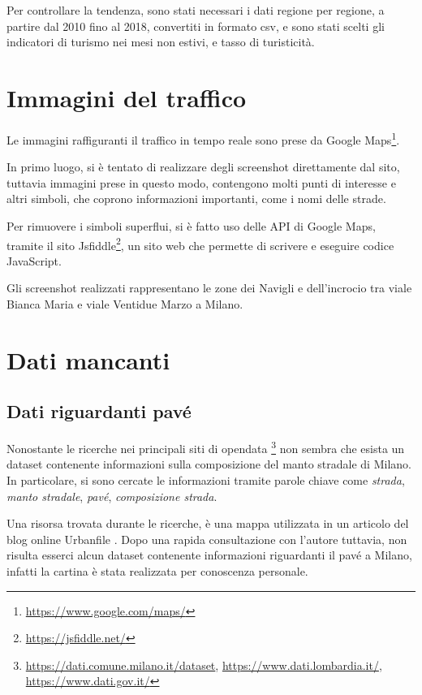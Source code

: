 \documentclass[a4paper,12pt]{report}
\newcommand{\quotestyle}[1]{\textit{#1}}
\begin{document}
Per controllare la tendenza, sono stati necessari i dati regione per regione, 
a partire dal 2010 fino al 2018, convertiti in formato csv, e sono stati scelti gli 
indicatori di turismo nei mesi non estivi, e tasso di turisticità. 

\section{Immagini del traffico}

Le immagini raffiguranti il traffico in tempo reale sono prese da Google 
Maps\footnote{\url{https://www.google.com/maps/}}. 

In primo luogo, si è tentato di realizzare degli screenshot direttamente dal sito, 
tuttavia immagini prese in questo modo, contengono molti punti di interesse e altri simboli, 
che coprono informazioni importanti, come i nomi delle strade.

Per rimuovere i simboli superflui, si è fatto uso delle API di Google Maps, 
tramite il sito Jsfiddle\footnote{\url{https://jsfiddle.net/}}, un sito web che permette di 
scrivere e eseguire codice JavaScript. 

Gli screenshot realizzati rappresentano le zone dei Navigli e dell'incrocio tra viale 
Bianca Maria e viale Ventidue Marzo a Milano.

\section{Dati mancanti}

\subsection{Dati riguardanti pavé}

Nonostante le ricerche nei principali siti di opendata
\footnote{
    \url{https://dati.comune.milano.it/dataset}, 
    \url{https://www.dati.lombardia.it/},
    \url{https://www.dati.gov.it/}}
non sembra che esista un dataset contenente informazioni sulla composizione del 
manto stradale di Milano. 
In particolare, si sono cercate le informazioni tramite parole chiave come 
\quotestyle{strada}, \quotestyle{manto stradale}, \quotestyle{pavé}, 
\quotestyle{composizione strada}.

Una risorsa trovata durante le ricerche, è una mappa utilizzata in un articolo del blog online 
Urbanfile \cite{URBANFILE:1}. 
Dopo una rapida consultazione con l'autore tuttavia, non risulta esserci alcun 
dataset contenente informazioni riguardanti il pavé a Milano, infatti la cartina è 
stata realizzata per conoscenza personale.
\end{document}
